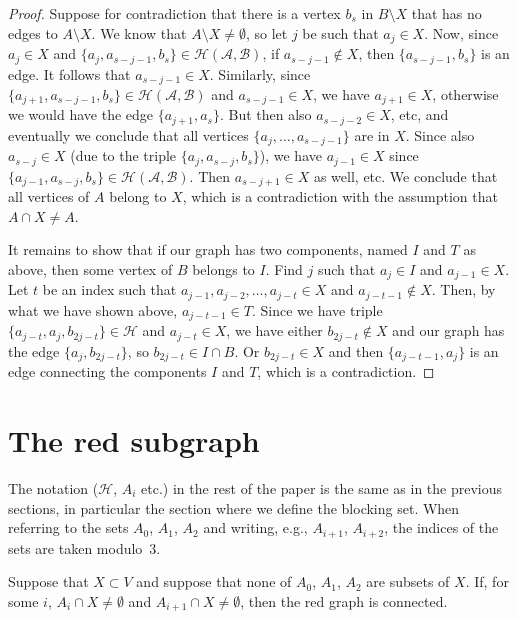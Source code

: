 \documentclass[11pt,a4paper]{article}
\begin{document}
\begin{proof}
Suppose for contradiction that there is a vertex $b_s$ in $B\setminus X$ that has no edges to $A\setminus X$. We know that $A\setminus X\neq \emptyset$, so let $j$ be such that $a_j\in X$. Now, since $a_j\in X$ and $\{a_j,a_{s-j-1},b_s\}\in \mathcal{H(A,B)}$, if $a_{s-j-1}\not\in X$, then $\{a_{s-j-1},b_s\}$ is an edge. It follows that $a_{s-j-1}\in X$. Similarly, since $\{a_{j+1},a_{s-j-1},b_s\}\in \mathcal{H(A,B)}$ and $a_{s-j-1}\in X$, we have $a_{j+1}\in X$, otherwise we would have the edge $\{a_{j+1},a_s\}$. But then also $a_{s-j-2}\in X$, etc, and eventually we conclude that all vertices $\{a_j,\dots,a_{s-j-1}\}$ are in $X$. Since also $a_{s-j}\in X$ (due to the triple $\{a_{j},a_{s-j},b_s\}$), we have $a_{j-1}\in X$ since $\{a_{j-1},a_{s-j},b_s\}\in \mathcal{H(A,B)}$. Then $a_{s-j+1}\in X$ as well, etc. We conclude that all vertices of $A$ belong to $X$, which is a contradiction with the assumption that $A\cap X\neq A$.

It remains to show that if our graph has two components, named $I$ and $T$ as above, then some vertex of $B$ belongs to $I$. Find $j$ such that $a_j\in I$ and $a_{j-1}\in X$. Let $t$ be an index such that $a_{j-1},a_{j-2},\dots,a_{j-t}\in X$ and $a_{j-t-1}\not\in X$. Then, by what we have shown above, $a_{j-t-1}\in T$. Since we have triple $\{a_{j-t},a_j,b_{2j-t}\}\in \mathcal{H}$ and $a_{j-t}\in X$, we have either $b_{2j-t}\not\in X$ and our graph has the edge $\{a_j,b_{2j-t}\}$, so $b_{2j-t}\in I\cap B$. Or $b_{2j-t}\in X$ and then $\{a_{j-t-1},a_j\}$ is an edge connecting the components $I$ and $T$, which is a contradiction.
\end{proof}






\section{The red subgraph}

The notation ($\mathcal{H}$, $A_i$ etc.) in the rest of the paper is the same as in the previous sections, in particular the section where we define the blocking set. When referring to the sets $A_0$, $A_1$, $A_2$ and writing, e.g., $A_{i+1}$, $A_{i+2}$, the indices of the sets are taken modulo~3.


\begin{lemma}\label{lemma:connected123}
Suppose that $X\subset V$ and suppose that none of $A_0$, $A_1$, $A_2$ are subsets of $X$. If, for some $i$, $A_i\cap X\neq \emptyset$ and $A_{i+1}\cap X\neq \emptyset$, then the red graph is connected.
\end{lemma}
\end{document}
